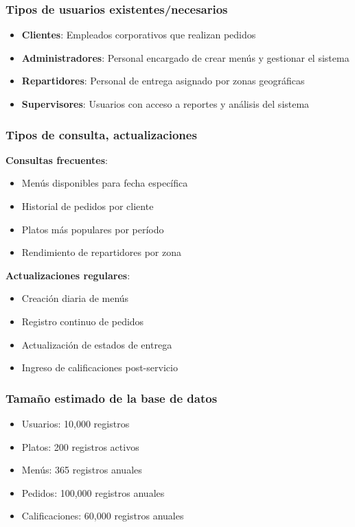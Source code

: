 \documentclass[12pt,a4paper]{article}
\begin{document}
\subsubsection{Tipos de usuarios existentes/necesarios}
\begin{itemize}
    \item \textbf{Clientes}: Empleados corporativos que realizan pedidos
    \item \textbf{Administradores}: Personal encargado de crear menús y gestionar el sistema
    \item \textbf{Repartidores}: Personal de entrega asignado por zonas geográficas
    \item \textbf{Supervisores}: Usuarios con acceso a reportes y análisis del sistema
\end{itemize}

\subsubsection{Tipos de consulta, actualizaciones}
\textbf{Consultas frecuentes}:
\begin{itemize}
    \item Menús disponibles para fecha específica
    \item Historial de pedidos por cliente
    \item Platos más populares por período
    \item Rendimiento de repartidores por zona
\end{itemize}

\textbf{Actualizaciones regulares}:
\begin{itemize}
    \item Creación diaria de menús
    \item Registro continuo de pedidos
    \item Actualización de estados de entrega
    \item Ingreso de calificaciones post-servicio
\end{itemize}

\subsubsection{Tamaño estimado de la base de datos}
\begin{itemize}
    \item Usuarios: 10,000 registros
    \item Platos: 200 registros activos
    \item Menús: 365 registros anuales
    \item Pedidos: 100,000 registros anuales
    \item Calificaciones: 60,000 registros anuales
\end{itemize}
\end{document}
